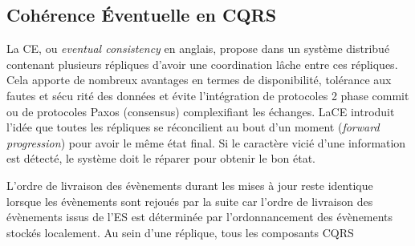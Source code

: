 \subsection{Cohérence Éventuelle en CQRS}

La \gls{CE}, ou \textit{eventual consistency} en anglais, propose dans un système 
distribué contenant plusieurs répliques d'avoir une coordination lâche entre ces 
répliques. Cela apporte de nombreux avantages en termes de disponibilité, 
tolérance aux fautes et sécu rité des données et évite l'intégration de protocoles 2 
phase commit ou de protocoles Paxos (consensus) complexifiant les échanges. 
La\gls{CE} introduit l'idée que toutes les répliques se réconcilient au bout d'un 
moment (\textit{forward progression}) pour avoir le même état final. Si le caractère 
vicié d'une information est détecté, le système doit le \og réparer\fg{} pour obtenir 
le bon état. 

L'ordre de livraison des évènements durant les mises à jour reste identique lorsque 
les évènements sont rejoués par la suite car l'ordre de livraison des évènements 
issus de l'\gls{ES} est déterminée par l'ordonnancement des évènements stockés 
localement. Au sein d'une réplique, tous les composants \gls{CQRS}

%
%



